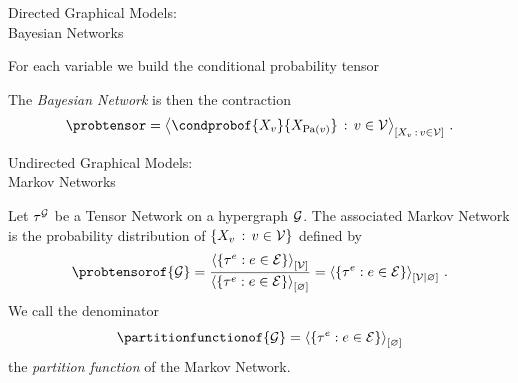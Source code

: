 \documentclass{beamer}
\begin{document}
\begin{frame}{Directed Graphical Models:\\
Bayesian Networks}

    For each variable we build the conditional probability tensor
    \begin{center}
        
    \end{center}
    The \emph{Bayesian Network} is then the contraction
    \begin{align*}
        \probtensor = \contractionof{\condprobof{\catvariableof{\node}}{\catvariableof{\parentsof{\node}}} \, : \, \nodein}{\catvariableof{\node} \, : \, \nodein} \, .
    \end{align*}

\end{frame}



\begin{frame}{Undirected Graphical Models:\\
Markov Networks}


    \begin{definition}
	Let $\tau^{\mathcal{G}}$ be a Tensor Network on a hypergraph $\mathcal{G}$.
    The associated Markov Network is the probability distribution of $\{X_{v}\,:\,v\in\mathcal{V}\}$ defined by
    \[ \probtensorof{\graph} = \frac{
        \contractionof{\{\hypercoreof{\edge} : \edge \in \edges\}}{\nodes}
    }{
        \contractionof{\{\hypercoreof{\edge} : \edge \in \edges\}}{\varnothing}
    } = \normalizationofwrt{\{\hypercoreof{\edge} : \edge \in \edges\}}{\nodes}{\varnothing} \, . \]
    We call the denominator
    \[\partitionfunctionof{\graph} = \contractionof{\{\hypercoreof{\edge} : \edge \in \edges\}}{\varnothing} \]
    the \emph{partition function} of the Markov Network.
    \end{definition}

\end{frame}
\end{document}
